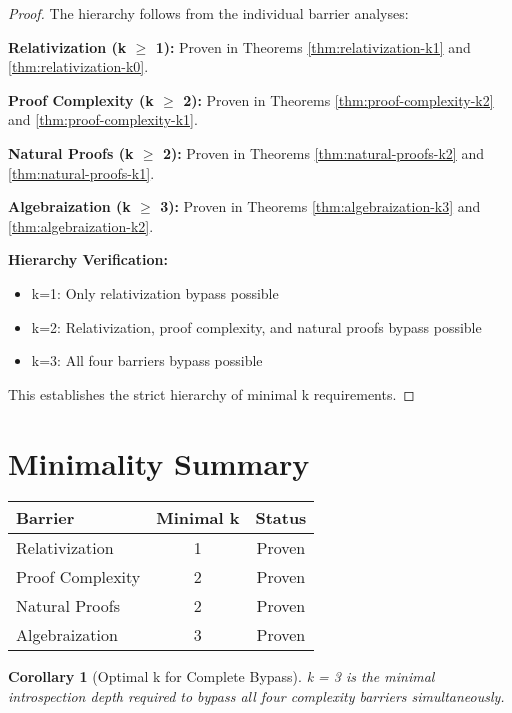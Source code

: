 \documentclass[11pt]{article}
\newtheorem{corollary}{Corollary}
\begin{document}
\begin{proof}
The hierarchy follows from the individual barrier analyses:

\textbf{Relativization (k $\geq$ 1):} Proven in Theorems \ref{thm:relativization-k1} and \ref{thm:relativization-k0}.

\textbf{Proof Complexity (k $\geq$ 2):} Proven in Theorems \ref{thm:proof-complexity-k2} and \ref{thm:proof-complexity-k1}.

\textbf{Natural Proofs (k $\geq$ 2):} Proven in Theorems \ref{thm:natural-proofs-k2} and \ref{thm:natural-proofs-k1}.

\textbf{Algebraization (k $\geq$ 3):} Proven in Theorems \ref{thm:algebraization-k3} and \ref{thm:algebraization-k2}.

\textbf{Hierarchy Verification:}
\begin{itemize}
\item k=1: Only relativization bypass possible
\item k=2: Relativization, proof complexity, and natural proofs bypass possible
\item k=3: All four barriers bypass possible
\end{itemize}

This establishes the strict hierarchy of minimal k requirements.
\end{proof}

\section{Minimality Summary}

\begin{center}
\begin{tabular}{|l|c|c|}
\hline
\textbf{Barrier} & \textbf{Minimal k} & \textbf{Status} \\
\hline
Relativization & 1 & Proven \\
Proof Complexity & 2 & Proven \\
Natural Proofs & 2 & Proven \\
Algebraization & 3 & Proven \\
\hline
\end{tabular}
\end{center}

\begin{corollary}[Optimal k for Complete Bypass]
\label{cor:optimal-k}
k = 3 is the minimal introspection depth required to bypass all four complexity barriers simultaneously.
\end{corollary}
\end{document}
